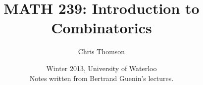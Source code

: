 \documentclass[]{article}
\begin{document}
\title{\bf{MATH 239: Introduction to Combinatorics}}
\date{Winter 2013, University of Waterloo \\ \center Notes written from Bertrand Guenin's lectures.}
\author{Chris Thomson}
\maketitle
\newpage
\end{document}
